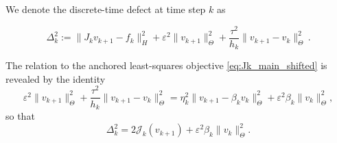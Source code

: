 \documentclass[oneside,11pt]{article}
\theoremstyle{remark}
\theoremstyle{thmstyleone}
\theoremstyle{thmstylethree}
\theoremstyle{thmstyletwo}
\newcommand{\norm}[1]{\lVert #1\rVert}
\newcommand{\mcJ}{\mathcal{J}}
\newcommand{\tc}[1]{#1}
\begin{document}
We denote the discrete-time defect at time step $k$ as
\tc{
\begin{equation}
  \Delta_k^2
  :=
  \norm{J_kv_{k+1}-f_k}_H^2
  +
  \varepsilon^2\norm{v_{k+1}}_\Theta^2
  +
  \frac{\tau^2}{h_k}\norm{v_{k+1}-v_k}_\Theta^2\,.
  \label{eq:Delta_min_error}
\end{equation}
}
\tc{
The relation to the anchored least-squares objective \eqref{eq:Jk_main_shifted} is revealed by the identity
\begin{equation}
  \varepsilon^2\norm{v_{k+1}}_\Theta^2
  +
  \frac{\tau^2}{h_k}\norm{v_{k+1}-v_k}_\Theta^2
  =
  \eta_k^2\norm{v_{k+1}-\beta_kv_k}_\Theta^2
  +
  \varepsilon^2\beta_k\norm{v_k}_\Theta^2,
  \label{eq:Delta_augmented_identity_new}
\end{equation}
so that
\begin{equation}
  \Delta_k^2
  =
  2\mcJ_k(v_{k+1})
  +
  \varepsilon^2\beta_k\norm{v_k}_\Theta^2.
  \label{eq:Delta_objective_identity_new}
\end{equation}
}
\end{document}
